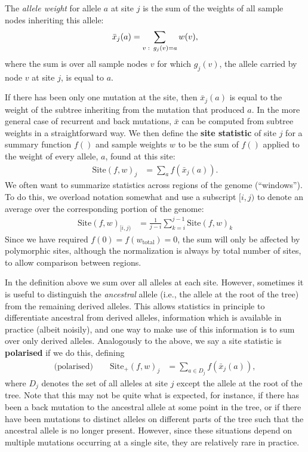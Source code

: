 \documentclass{article}
\newcommand{\site}{\mbox{Site}} %
\newcommand{\sitep}{\mbox{Site}_+} %
\newcommand{\iw}{w} %
\newcommand{\tiw}{w_\text{total}} %
\newcommand{\aw}{{\bar x}} %
\begin{document}
\begin{definition}
    The \emph{allele weight} for allele $a$ at site $j$ is the sum of the weights
    of all sample nodes inheriting this allele:
    \begin{align*}
        \aw_j(a) = \sum_{v \st g_j(v) = a} \iw(v) ,
    \end{align*}
    where the sum is over all sample nodes $v$ for which
    $g_j(v)$, the allele carried by node $v$ at site $j$, is equal to $a$.
\end{definition}

If there has been only one mutation at the site,
then $\aw_j(a)$ is equal to the weight of the subtree inheriting from the mutation that produced $a$.
In the more general case of recurrent and back mutations, $\aw$ can
be computed from subtree weights in a straightforward way.
We then define the \textbf{site statistic} of site $j$ for a summary function $f()$
and sample weights $\iw$ to be the sum of $f()$
applied to the weight of every allele, $a$, found at this site:
\begin{align}
    \site(f, \iw)_j
    &=
    \sum_{a} f(\aw_j(a)).
\end{align}
We often want to summarize statistics across regions of the genome (``windows'').
To do this, we overload notation somewhat and use a subscript $[i,j)$ to denote an average
over the corresponding portion of the genome:
\begin{align}
    \site(f, \iw)_{[i,j)}
    &=
    \frac{1}{j-i} \sum_{k=i}^{j-1} \site(f, \iw)_k
\end{align}
Since we have required $f(0) = f(\tiw) = 0$,
the sum will only be affected by polymorphic sites,
although the normalization is always by total number of sites, to allow comparison between regions.


In the definition above we sum over all alleles at each site.
However, sometimes it is useful to distinguish the \emph{ancestral} allele
(i.e., the allele at the root of the tree) from the remaining derived alleles.
This allows statistics in principle to differentiate ancestral from derived alleles,
information which is available in practice (albeit noisily),
and one way to make use of this information is to sum over only derived alleles.
Analogously to the above,
we say a site statistic is \textbf{polarised} if we do this,
defining
\begin{align} \label{eqn:site_polarised}
    \text{(polarised)} \qquad
    \sitep(f, \iw)_j
    &=
    \sum_{a \in D_j} f(\aw_j(a)) ,
\end{align}
where $D_j$ denotes the set of all alleles at site $j$ except the allele at the root of the tree.
Note that this may not be quite what is expected,
for instance, if there has been a back mutation to the ancestral allele at some point in the tree,
or if there have been mutations to distinct alleles on different parts of the tree
such that the ancestral allele is no longer present.
However, since these situations depend on multiple mutations occurring at a single site,
they are relatively rare in practice.
\end{document}

